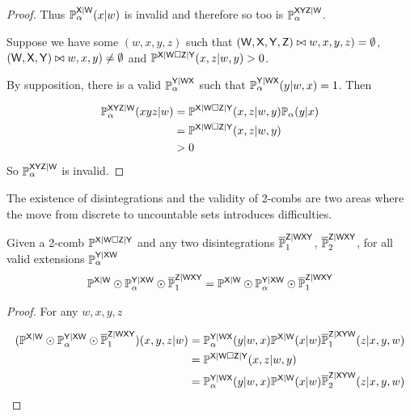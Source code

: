 \begin{proof}
Thus $\prob{P}_\alpha^{\RV{X}|\RV{W}}(x|w)$ is invalid and therefore so too is $\prob{P}_\alpha^{\RV{XYZ}|\RV{W}}$.

Suppose we have some $(w,x,y,z)$ such that $(\RV{W},\RV{X},\RV{Y},\RV{Z})\yields(w,x,y,z)= \emptyset$, $(\RV{W},\RV{X},\RV{Y})\yields(w,x,y)\neq \emptyset$ and $\prob{P}^{\RV{X}|\RV{W}\square\RV{Z}|\RV{Y}}(x,z|w,y)>0$.

By supposition, there is a valid $\prob{P}_\alpha^{\RV{Y}|\RV{WX}}$ such that $\prob{P}_\alpha^{\RV{Y}|\RV{WX}}(y|w,x)=1$. Then

\begin{align}
	\prob{P}_\alpha^{\RV{XYZ}|\RV{W}}(xyz|w) &= \prob{P}^{\RV{X}|\RV{W}\square\RV{Z}|\RV{Y}}(x,z|w,y)\prob{P}_\alpha(y|x)\\
											 &= \prob{P}^{\RV{X}|\RV{W}\square\RV{Z}|\RV{Y}}(x,z|w,y)\\
											 &>0
\end{align}
So $\prob{P}_\alpha^{\RV{XYZ}|\RV{W}}$ is invalid.
\end{proof}

The existence of disintegrations and the validity of 2-combs are two areas where the move from discrete to uncountable sets introduces difficulties.

\begin{theorem}
Given a 2-comb $\prob{P}^{\RV{X}|\RV{W}\square\RV{Z}|\RV{Y}}$ and any two disintegrations $\disint{P}^{\RV{Z}|\RV{WXY}}_1$, $\disint{P}^{\RV{Z}|\RV{WXY}}_2$, for all valid extensions $\prob{P}_\alpha^{\RV{Y}|\RV{XW}}$
\begin{align}
	\prob{P}^{\RV{X}|\RV{W}}\odot \prob{P}_\alpha^{\RV{Y}|\RV{XW}} \odot \disint{P}^{\RV{Z}|\RV{WXY}}_1 = \prob{P}^{\RV{X}|\RV{W}}\odot \prob{P}_\alpha^{\RV{Y}|\RV{XW}} \odot \disint{P}^{\RV{Z}|\RV{WXY}}_1
\end{align}
\end{theorem}

\begin{proof}
For any $w,x,y,z$

\begin{align}
	(\prob{P}^{\RV{X}|\RV{W}}\odot \prob{P}_\alpha^{\RV{Y}|\RV{XW}} \odot \disint{P}^{\RV{Z}|\RV{WXY}}_1)(x,y,z|w) &= \prob{P}^{\RV{Y}|\RV{WX}}_\alpha(y|w,x)\prob{P}^{\RV{X}|\RV{W}}(x|w)\disint{P}_1^{\RV{Z}|\RV{XYW}}(z|x,y,w)\\
	&= \prob{P}^{\RV{X}|\RV{W}\square\RV{Z}|\RV{Y}}(x,z|w,y)\\
	&= \prob{P}^{\RV{Y}|\RV{WX}}_\alpha(y|w,x)\prob{P}^{\RV{X}|\RV{W}}(x|w)\disint{P}_2^{\RV{Z}|\RV{XYW}}(z|x,y,w)
\end{align}
\end{proof}

